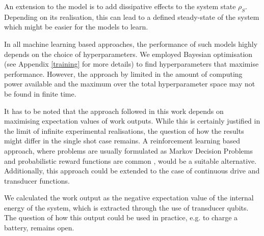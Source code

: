 An extension to the model is to add dissipative effects to the system state $\rho_S$.
Depending on its realisation, this can lead to a defined steady-state of the system which might be easier for the models to learn.

In all machine learning based approaches, the performance of such models highly depends on the choice of hyperparameters.
We employed Bayesian optimisation (see Appendix \ref{training} for more details) to find hyperparameters that maximise performance.
However, the approach by limited in the amount of computing power available and the maximum over the total hyperparameter space may not be found in finite time.

It has to be noted that the approach followed in this work depends on maximising expectation values of work outputs.
While this is certainly justified in the limit of infinite experimental realisations, the question of how the results might differ in the single shot case remains.
A reinforcement learning based approach, where problems are usually formulated as Markov Decision Problems and probabilistic reward functions are common \cite{Sutton1998}, would be a suitable alternative.
Additionally, this approach could be extended to the case of continuous drive and transducer functions.

We calculated the work output as the negative expectation value of the internal energy of the system, which is extracted through the use of transducer qubits.
The question of how this output could be used in practice, e.g. to charge a battery, remains open.